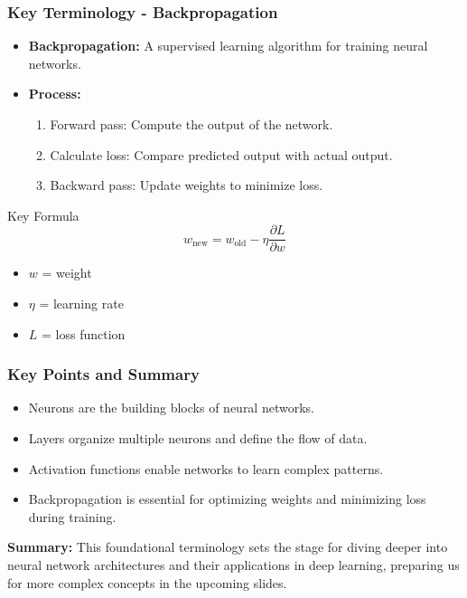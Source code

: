 \documentclass[aspectratio=169]{beamer}
\begin{document}
\begin{frame}[fragile]
    \frametitle{Key Terminology - Backpropagation}
    \begin{itemize}
        \item \textbf{Backpropagation:} A supervised learning algorithm for training neural networks.
        \item \textbf{Process:}
        \begin{enumerate}
            \item Forward pass: Compute the output of the network.
            \item Calculate loss: Compare predicted output with actual output.
            \item Backward pass: Update weights to minimize loss.
        \end{enumerate}
    \end{itemize}
    \begin{block}{Key Formula}
        \[
        w_{\text{new}} = w_{\text{old}} - \eta \frac{\partial L}{\partial w}
        \]
        \begin{itemize}
            \item \(w\) = weight
            \item \(\eta\) = learning rate
            \item \(L\) = loss function
        \end{itemize}
    \end{block}
\end{frame}

\begin{frame}[fragile]
    \frametitle{Key Points and Summary}
    \begin{itemize}
        \item Neurons are the building blocks of neural networks.
        \item Layers organize multiple neurons and define the flow of data.
        \item Activation functions enable networks to learn complex patterns.
        \item Backpropagation is essential for optimizing weights and minimizing loss during training.
    \end{itemize}
    
    \textbf{Summary:} This foundational terminology sets the stage for diving deeper into neural network architectures and their applications in deep learning, preparing us for more complex concepts in the upcoming slides.
\end{frame}
\end{document}
